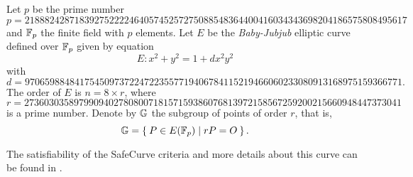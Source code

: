 Let $p$ be the prime number
$$	 {p = 218882428718392752222464057452572750885
			  48364400416034343698204186575808495617 } $$
and $\mathbb{F}_p$ the finite field with $p$ elements. 
%
Let $E$ be the {\it Baby-Jubjub} elliptic curve defined over $\mathbb{F}_p$ given %
by equation
$$	E: x^2 + y^2 = 1 +  d x^2 y^2 $$
with
$ d = 9706598848417545097372247223557719406784115219466060233080913168975159366771.$ 
The order of $E$ is $n = 8\times r$, where 
$$	r = 2736030358979909402780800718157159386076813972
		158567259200215660948447373041 $$ 
is a prime number. Denote by $\mathbb{G}$ the subgroup of points of order $r$, that is, %
$$\mathbb{G} = \Set{ P \in E(\ensuremath{\mathbb{F}_p}) | r P = O  }.$$
		
The satisfiability of {\color{purple}the} SafeCurve %
criteria \cite{safe-curves} and more details about this curve can be found in %
\cite{github-barry}. 



